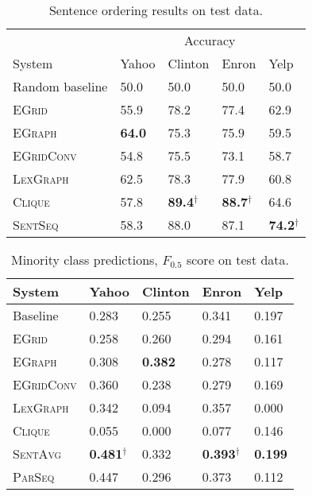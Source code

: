 \documentclass[11pt,a4paper]{article}
\newcommand \egrid{\textsc{EGrid}\xspace}
\newcommand \egraph{\textsc{EGraph}\xspace}
\newcommand \lexgraph{\textsc{LexGraph}\xspace}
\newcommand \parseq{\textsc{ParSeq}\xspace}
\newcommand \sentseq{\textsc{SentSeq}\xspace}
\newcommand \clique{\textsc{Clique}\xspace}
\newcommand \sentavg{\textsc{SentAvg}\xspace}
\newcommand \egridconv{\textsc{EGridConv}\xspace}
\begin{document}
\begin{table}\begin{center}
\begin{small}
\begin{tabular}{@{}lllll@{}}
	\toprule
    & \multicolumn{4}{c}{Accuracy} \\
	System & Yahoo & Clinton & Enron & Yelp \\	
	\midrule
    Random baseline & 50.0 & 50.0 & 50.0 & 50.0 \\
\midrule
	\egrid & 55.9 & 78.2 & 77.4 & 62.9 \\
    \egraph & \textbf{64.0} & 75.3 & 75.9 & 59.5 \\
\egridconv & 54.8 & 75.5 & 73.1 & 58.7 \\
	\midrule
    \lexgraph & 62.5 & 78.3 & 77.9 & 60.8 \\ 
    \midrule
\clique & 57.8 & \textbf{89.4}$^{\dag}$ & \textbf{88.7}$^{\dag}$ & 64.6 \\
    \sentseq & 58.3 & 88.0 & 87.1 & \textbf{74.2}$^{\dag}$ \\


	\bottomrule
\end{tabular}
\end{small}
\caption{Sentence ordering results on test data.}
\label{tab:permutation_test}
\end{center}
\end{table}

\begin{table}[t]
\begin{center}
\begin{footnotesize}
\begin{tabular}{@{}lllll@{}}
	\toprule
	System & Yahoo & Clinton & Enron  & Yelp \\	
    \midrule
    Baseline & 0.283 & 0.255 & 0.341 & 0.197 \\ 
    \midrule
    \egrid & 0.258 & 0.260 & 0.294 & 0.161 \\
    \egraph & 0.308 & \textbf{0.382} & 0.278 & 0.117 \\
	\egridconv & 0.360 & 0.238 & 0.279 & 0.169 \\ 
\midrule
	\lexgraph & 0.342 & 0.094 & 0.357 & 0.000 \\
    \midrule
    \clique & 0.055 & 0.000 & 0.077 & 0.146 \\
\sentavg & \textbf{0.481}$^{\dag}$ & 0.332  & \textbf{0.393}$^{\dag}$ & \textbf{0.199} \\	
\parseq & 0.447 & 0.296 & 0.373 & 0.112 \\	
	\bottomrule
\end{tabular}
\end{footnotesize}
\caption{Minority class predictions, $F_{0.5}$ score on test data.}
\label{tab:minority_test_f}
\end{center}
\end{table}
\end{document}
